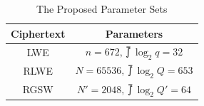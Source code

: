 \begin{table}[t!] 
    \centering
    \caption{The Proposed Parameter Sets}
    \vspace{0em}
        \begin{tabular}{cc}
            \toprule
            Ciphertext &  Parameters\\
            \midrule
            LWE & $n=672, \upint{\log_{2}{q} } = 32$\\
            RLWE & $N=65536, \upint{\log_{2}{Q} } = 653$\\
            RGSW & $N'=2048, \upint{\log_{2}{Q'} } = 64$\\

            \bottomrule
        \end{tabular}
    \label{tab:parameters}
\end{table}
